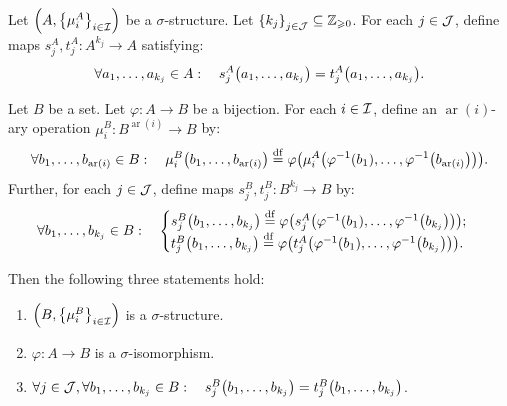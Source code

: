 \documentclass[11pt,reqno]{amsart}
\DeclareMathOperator{\ar}{ar}
\renewcommand{\phi}{\varphi}
\begin{document}
\begin{lemma}
Let $\Br{A,\set{\mu_i^A}_{i\in\I}}$ be a $\sigma$-structure.
Let $\set{k_j}_{j\in\J}\subseteq\Z_{\ge0}$.
For each $j\in\mathcal{J}$, define maps $s_j^A,t_j^A:A^{k_j}\to A$
satisfying:
\[\forall a_1,\dots,a_{k_j}\in A:\quad
s_j^A\Br{a_1,\dots,a_{k_j}}=t_j^A\Br{a_1,\dots,a_{k_j}}.
\]

Let $B$ be a set.
Let $\phi:A\to B$ be a bijection.
For each $i\in\mathcal{I}$, define an $\ar(i)$-ary operation
$\mu_i^B:B^{\ar(i)}\to B$ by:
\[\forall b_1,\dots,b_{\ar(i)}\in B:\quad
\mu_i^B\Br{b_1,\dots,b_{\ar(i)}}\df
\phi\Br{\mu_i^A\Br{\phi\inv(b_1),\dots,\phi\inv\Br{b_{\ar(i)}}}}.
\]
Further, for each $j\in\mathcal{J}$, define maps
$s_j^B,t_j^B:B^{k_j}\to B$ by:
\[
\forall b_1,\dots,b_{k_j}\in B:\quad
\begin{cases}
s_j^B\Br{b_1,\dots,b_{k_j}}
\df\phi\Br{s_j^A\Br{\phi\inv(b_1),\dots,\phi\inv\Br{b_{k_j}}}};\\
t_j^B\Br{b_1,\dots,b_{k_j}}
\df\phi\Br{t_j^A\Br{\phi\inv(b_1),\dots,\phi\inv\Br{b_{k_j}}}}.\\
\end{cases}
\]

Then the following three statements hold:
\begin{enumerate}
\item $\Br{B,\set{\mu_i^B}_{i\in\I}}$ is a $\sigma$-structure.
\item $\phi:A\to B$ is a $\sigma$-isomorphism.
\item $\forall j\in\J,\forall b_1,\dots,b_{k_j}\in B:\quad
s_j^B\Br{b_1,\dots,b_{k_j}}=t_j^B\Br{b_1,\dots,b_{k_j}}$.
\end{enumerate}
\end{lemma}
\end{document}

